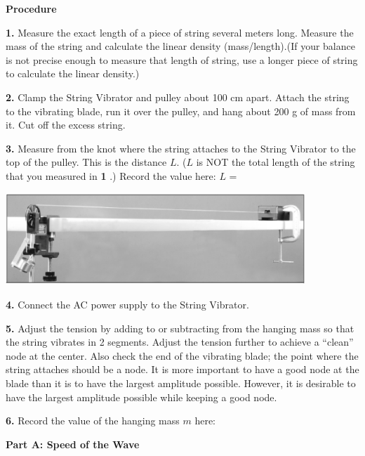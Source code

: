 \textbf{Procedure}

\textbf{1. } Measure the exact length of a piece of string several meters long. Measure the mass of the
string and calculate the linear density (mass/length).(If your balance is not precise enough to measure that length of string, use a longer
piece of string to calculate the linear density.)

\vspace{2cm}

\textbf{2. } Clamp the String Vibrator and pulley about 100 cm apart. Attach the string to the vibrating blade, run it over the pulley, and hang about 200 g of mass from it. Cut off the excess string.

\textbf{3. } Measure from the knot where the string attaches to the String Vibrator to the top of the pulley.
This is the distance $L$. ($L$ is NOT the total length of the string that you measured in \textbf{1 }.) Record the value here: $L$ =

\vspace{0.3cm}
\begin{center}
\includegraphics[width=320pt]{Standing_waves_strings_figure3.eps}
\end{center}
\vspace{0.3cm}

\textbf{4. } Connect the AC power supply to the String Vibrator.

\textbf{5. } Adjust the tension by adding to or subtracting from the hanging mass so that the string vibrates in 2 segments. Adjust the tension further to achieve a ``clean'' node at the center. Also check the end of the vibrating blade; the point where the string attaches should be a node. It is more important to have a good node at the blade than it is to have the largest amplitude possible. However, it is desirable to have the largest amplitude possible while keeping a good node.

\textbf{6. } Record the value of the hanging mass $m$ here:

\vspace{3cm}

\textbf{Part A: Speed of the Wave }

